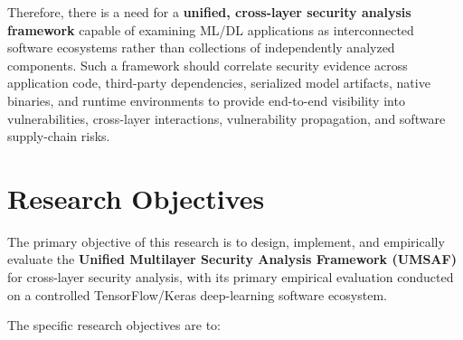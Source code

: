 \documentclass[
  12pt,
  letterpaper,
  oneside]{report}
\begin{document}
Therefore, there is a need for a \textbf{unified, cross-layer security
analysis framework} capable of examining ML/DL applications as
interconnected software ecosystems rather than collections of
independently analyzed components. Such a framework should correlate
security evidence across application code, third-party dependencies,
serialized model artifacts, native binaries, and runtime environments to
provide end-to-end visibility into vulnerabilities, cross-layer
interactions, vulnerability propagation, and software supply-chain
risks.

\chapter{Research Objectives}\label{3-research-objectives}

The primary objective of this research is to design, implement, and
empirically evaluate the \textbf{Unified Multilayer Security Analysis
Framework (UMSAF)} for cross-layer security analysis, with its primary
empirical evaluation conducted on a controlled TensorFlow/Keras
deep-learning software ecosystem.

The specific research objectives are to:
\end{document}
